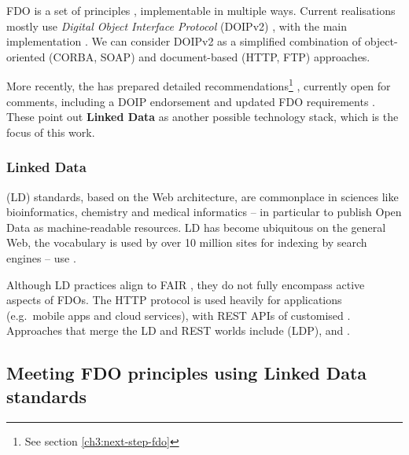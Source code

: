 FDO is a set of principles \cite{Bonino 2019}, implementable in multiple ways. Current realisations mostly
use \emph{Digital Object Interface Protocol} (DOIPv2)
\cite{DONA 2018}, with the
main implementation
. We
can consider DOIPv2 as a simplified combination of object-oriented
(CORBA, SOAP) and document-based (HTTP, FTP) approaches.

More recently, the  has prepared 
detailed recommendations\footnote{See section \vref{ch3:next-step-fdo}} \cite{FDO Specs},
currently open for comments, including a
DOIP endorsement \cite{Schwardmann 2022a} and updated
FDO requirements \cite{Anders 2023}. These point out \textbf{Linked Data} as another possible
technology stack, which is the focus of this work.

\subsubsection{Linked Data}
\label{ch2:linked-data}

 (LD) standards, based on the Web architecture, are commonplace in
sciences like bioinformatics, chemistry and medical informatics -- in
particular to publish Open Data as machine-readable resources. LD has
become ubiquitous on the general Web, the
 vocabulary is used by over 10
million sites for indexing by search engines --
 use .

Although \acrshort{LD} practices align to \acrshort{FAIR} \cite{Hasnain 2018},
they do not fully encompass active aspects of FDOs. The HTTP protocol is
used heavily for applications (e.g.~mobile apps and cloud services),
with \acrshort{REST} \acrshort{API}s of customised . Approaches that merge the LD and REST worlds include
 (LDP),
 and
.


\subsection{Meeting FDO principles using Linked Data
standards}\label{ch2:meeting-fdo-principles-using-linked-data-standards}

